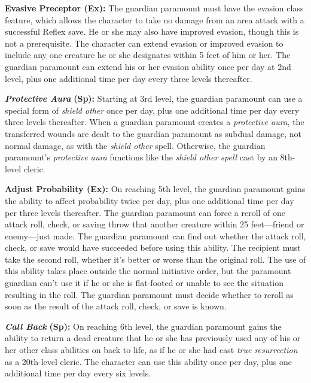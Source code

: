 \documentclass{article}
\begin{document}
\textbf{Evasive Preceptor (Ex):} The guardian paramount must have the evasion class 
feature, which allows the character to take no damage from an area attack with 
a successful Reflex save. He or she may also have improved evasion, though this 
is not a prerequisite. The character can extend evasion or improved evasion to 
include any one creature he or she designates within 5 feet of him or her. The 
guardian paramount can extend his or her evasion ability once per day at 2nd level, 
plus one additional time per day every three levels thereafter. 

\textit{\textbf{Protective Aura }}\textbf{(Sp):} Starting at 3rd level, the guardian 
paramount can use a special form of \textit{shield other }once per day, plus one 
additional time per day every three levels thereafter. When a guardian paramount 
creates a \textit{protective aur}a, the transferred wounds are dealt to the guardian 
paramount as subdual damage, not normal damage, as with the \textit{shield other 
}spell. Otherwise, the guardian paramount's \textit{protective aura }functions 
like the \textit{shield other spell }cast by an 8th-level cleric. 

\textbf{Adjust Probability (Ex):} On reaching 5th level, the guardian paramount 
gains the ability to affect probability twice per day, plus one additional time 
per day per three levels thereafter. The guardian paramount can force a reroll 
of one attack roll, check, or saving throw that another creature within 25 feet---friend 
or enemy---just made. The guardian paramount can find out whether the attack roll, 
check, or save would have succeeded before using this ability. The recipient must 
take the second roll, whether it's better or worse than the original roll. The 
use of this ability takes place outside the normal initiative order, but the paramount 
guardian can't use it if he or she is flat-footed or unable to see the situation 
resulting in the roll. The guardian paramount must decide whether to reroll as 
soon as the result of the attack roll, check, or save is known. 

\textit{\textbf{Call Back }}\textbf{(Sp):} On reaching 6th level, the guardian 
paramount gains the ability to return a dead creature that he or she has previously 
used any of his or her other class abilities on back to life, as if he or she had 
cast \textit{true resurrection }as a 20th-level cleric. The character can use this 
ability once per day, plus one additional time per day every six levels. 

\vspace{12pt}
\end{document}
